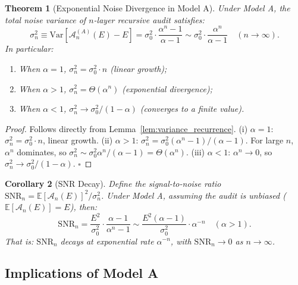 \documentclass[12pt,a4paper]{article}
\newtheorem{theorem}{Theorem}[section]
\newtheorem{corollary}[theorem]{Corollary}
\theoremstyle{definition}
\newcommand{\E}{\mathbb{E}}
\newcommand{\Var}{\mathrm{Var}}
\newcommand{\AuditOp}{\mathcal{A}}
\newcommand{\SNR}{\mathrm{SNR}}
\begin{document}
\begin{theorem}[Exponential Noise Divergence in Model A]\label{thm:model_a_divergence}
Under Model A, the total noise variance of $n$-layer recursive audit satisfies:
\begin{equation}\label{eq:model_a_variance}
    \sigma_n^2 \equiv \Var[\AuditOp_n^{(A)}(E) - E] = \sigma_0^2 \cdot \frac{\alpha^n - 1}{\alpha - 1} \sim \sigma_0^2 \cdot \frac{\alpha^n}{\alpha - 1} \quad (n \to \infty).
\end{equation}
In particular:
\begin{enumerate}[label=(\roman*), leftmargin=*]
    \item When $\alpha = 1$, $\sigma_n^2 = \sigma_0^2 \cdot n$ (linear growth);
    \item When $\alpha > 1$, $\sigma_n^2 = \Theta(\alpha^n)$ (exponential divergence);
    \item When $\alpha < 1$, $\sigma_n^2 \to \sigma_0^2 / (1 - \alpha)$ (converges to a finite value).
\end{enumerate}
\end{theorem}

\begin{proof}
Follows directly from Lemma~\ref{lem:variance_recurrence}.
(i) $\alpha=1$: $\sigma_n^2 = \sigma_0^2 \cdot n$, linear growth.
(ii) $\alpha>1$: $\sigma_n^2 = \sigma_0^2 (\alpha^n - 1)/(\alpha - 1)$. For large $n$, $\alpha^n$ dominates, so $\sigma_n^2 \sim \sigma_0^2 \alpha^n/(\alpha - 1) = \Theta(\alpha^n)$.
(iii) $\alpha<1$: $\alpha^n \to 0$, so $\sigma_n^2 \to \sigma_0^2/(1 - \alpha)$. \hfill$\square$
\end{proof}

\begin{corollary}[SNR Decay]\label{cor:snr_decay}
Define the signal-to-noise ratio $\SNR_n = \E[\AuditOp_n(E)]^2 / \sigma_n^2$. Under Model A, assuming the audit is unbiased ($\E[\AuditOp_n(E)] = E$), then:
\begin{equation}\label{eq:snr_model_a}
    \SNR_n = \frac{E^2}{\sigma_0^2} \cdot \frac{\alpha - 1}{\alpha^n - 1} \sim \frac{E^2(\alpha - 1)}{\sigma_0^2} \cdot \alpha^{-n} \quad (\alpha > 1).
\end{equation}
That is: $\SNR_n$ decays at exponential rate $\alpha^{-n}$, with $\SNR_n \to 0$ as $n \to \infty$.
\end{corollary}

\subsection{Implications of Model A}
\end{document}
